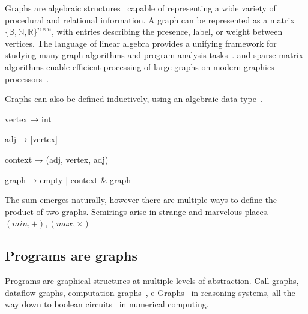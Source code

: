 \documentclass[11pt]{article}
\begin{document}

    Graphs are algebraic structures~\cite{weisfeiler1968reduction} capable of representing a wide variety of procedural and relational information. A graph can be represented as a matrix $\{\mathbb{B}, \mathbb{N}, \mathbb{R}\}^{n\times n}$, with entries describing the presence, label, or weight between vertices. The language of linear algebra provides a unifying framework for studying many graph algorithms and program analysis tasks~\citep{kepner2011graph}. and sparse matrix algorithms enable efficient processing of large graphs on modern graphics processors~\citep{kepner2016mathematical}.

    Graphs can also be defined inductively, using an algebraic data type~\cite{mokhov2017algebraic}.

    vertex  → int

    adj     → [vertex]

    context → (adj, vertex, adj)

    graph   → empty | context & graph

    The sum emerges naturally, however there are multiple ways to define the product of two graphs. Semirings arise in strange and marvelous places. $(min, +), (max, \times)$

    \subsection{Programs are graphs}\label{sec:program-graphs}

    Programs are graphical structures at multiple levels of abstraction. Call graphs, dataflow graphs, computation graphs~\citep{breuleux2017automatic}, e-Graphs~\citep{willsey2020egg} in reasoning systems, all the way down to boolean circuits~\citep{miller1988efficient} in numerical computing.
\end{document}
